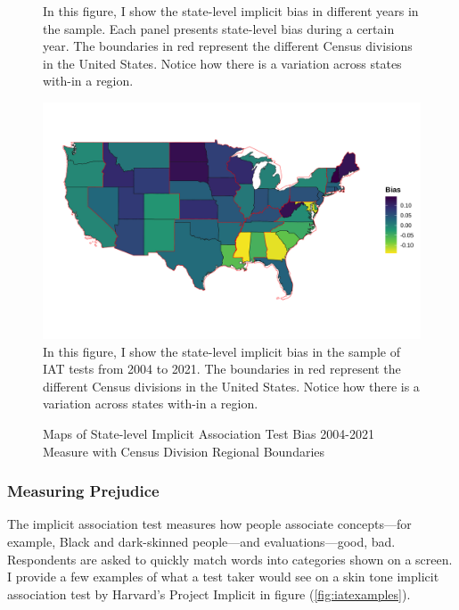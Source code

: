\documentclass[12pt, fullpage]{article}
\newcommand{\note}[1]{\flushleft\footnotesize{#1}}
\begin{document}
\begin{center}
\begin{figure}[H]
\begin{subfigure}{.3\textwidth}
\label{fig:skiniat-map-2018}
\hfill%
\end{subfigure}
\flushleft\footnotesize{\note{In this figure, I show the state-level implicit bias in different years in the sample. Each panel presents state-level bias during a certain year. The boundaries in red represent the different Census divisions in the United States. Notice how there is a variation across states with-in a region.}}
\end{figure}
\end{center}



\newpage
\pagebreak

\begin{center}
\begin{figure}[H]
\caption{Maps of State-level Implicit Association Test Bias 2004-2021 Measure with Census Division Regional Boundaries}
\includegraphics[width=\textwidth]{figure/skinmap_all.png} 
\label{fig:iat-map-all}
\flushleft\footnotesize{\note{In this figure, I show the state-level implicit bias in the sample of IAT tests from 2004 to 2021. The boundaries in red represent the different Census divisions in the United States. Notice how there is a variation across states with-in a region.}}
\end{figure}
\end{center}

\subsubsection{Measuring Prejudice}

The implicit association test measures how people associate concepts---for example, Black and dark-skinned people---and evaluations---good, bad. Respondents are asked to quickly match words into categories shown on a screen. I provide a few examples of what a test taker would see on a skin tone implicit association test by Harvard's Project Implicit in figure (\ref{fig:iatexamples}). 
\end{document}
